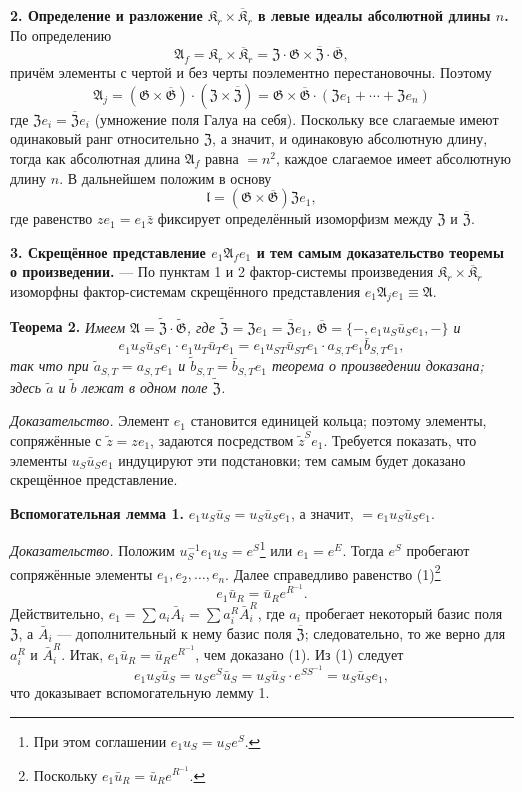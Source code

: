 \documentclass[11pt]{article}
\newcommand{\srcfn}[2]{\footnote{#2}}
\begin{document}
\noindent\textbf{2. Определение и разложение \(\mathfrak K_r\times\overline{\mathfrak K}_r\) в левые идеалы абсолютной длины \(n\).} По определению
\[
\mathfrak A_f=\mathfrak K_r\times\overline{\mathfrak K}_r
=\mathfrak Z\cdot\mathfrak G\times\overline{\mathfrak Z}\cdot\overline{\mathfrak G},
\]
причём элементы с чертой и без черты поэлементно перестановочны. Поэтому
\[
\mathfrak A_j
=(\mathfrak G\times\overline{\mathfrak G})\cdot(\mathfrak Z\times\overline{\mathfrak Z})
=\mathfrak G\times\overline{\mathfrak G}\cdot(\mathfrak Ze_1+\cdots+\mathfrak Ze_n)
\]
где \(\mathfrak Ze_i=\overline{\mathfrak Z}e_i\) (умножение поля Галуа на себя). Поскольку все слагаемые имеют одинаковый ранг относительно \(\mathfrak Z\), а значит, и одинаковую абсолютную длину, тогда как абсолютная длина \(\mathfrak A_f\) равна \(=n^2\), каждое слагаемое имеет абсолютную длину \(n\). В дальнейшем положим в основу
\[
\mathfrak l=(\mathfrak G\times\overline{\mathfrak G})\mathfrak Ze_1,
\]
где равенство \(ze_1=e_1\bar z\) фиксирует определённый изоморфизм между \(\mathfrak Z\) и \(\overline{\mathfrak Z}\).

\noindent\textbf{3. Скрещённое представление \(e_1\mathfrak A_fe_1\) и тем самым доказательство теоремы о произведении.} --- По пунктам 1 и 2 фактор-системы произведения \(\mathfrak K_r\times\overline{\mathfrak K}_r\) изоморфны фактор-системам скрещённого представления \(e_1\mathfrak A_je_1\equiv\mathfrak A\).

\noindent\textbf{Теорема 2.} \emph{Имеем \(\mathfrak A=\widetilde{\mathfrak Z}\cdot\widetilde{\mathfrak G}\), где \(\widetilde{\mathfrak Z}=\mathfrak Ze_1=\overline{\mathfrak Z}e_1\), \(\overline{\mathfrak G}=\{-,e_1u_S\bar u_Se_1,-\}\) и
\[
e_1u_S\bar u_Se_1\cdot e_1u_T\bar u_Te_1
=e_1u_{ST}\bar u_{ST}e_1\cdot a_{S,T}e_1\bar b_{S,T}e_1,
\]
так что при \(\tilde a_{S,T}=a_{S,T}e_1\) и \(\tilde b_{S,T}=\bar b_{S,T}e_1\) теорема о произведении доказана; здесь \(\tilde a\) и \(\tilde b\) лежат в одном поле \(\widetilde{\mathfrak Z}\).}

\noindent\emph{Доказательство.} Элемент \(e_1\) становится единицей кольца; поэтому элементы, сопряжённые с \(\tilde z=ze_1\), задаются посредством \(\tilde z^Se_1\). Требуется показать, что элементы \(u_S\bar u_Se_1\) индуцируют эти подстановки; тем самым будет доказано скрещённое представление.

\noindent\textbf{Вспомогательная лемма 1.} \(e_1u_S\bar u_S=u_S\bar u_Se_1\), а значит, \(=e_1u_S\bar u_Se_1\).

\noindent\emph{Доказательство.} Положим \(u_S^{-1}e_1u_S=e^S\)\srcfn{1}{При этом соглашении \(e_1u_S=u_Se^S\).} или \(e_1=e^E\). Тогда \(e^S\) пробегают сопряжённые элементы \(e_1,e_2,\ldots,e_n\). Далее справедливо равенство (1)\srcfn{2}{Поскольку \(e_1\bar u_R=\bar u_Re^{R^{-1}}\).}
\[
e_1\bar u_R=\bar u_Re^{R^{-1}}.
\]
Действительно, \(e_1=\sum a_i\bar A_i=\sum a_i^R\bar A_i^R\), где \(a_i\) пробегает некоторый базис поля \(\mathfrak Z\), а \(\bar A_i\) --- дополнительный к нему базис поля \(\overline{\mathfrak Z}\); следовательно, то же верно для \(a_i^R\) и \(\bar A_i^R\). Итак, \(e_1\bar u_R=\bar u_Re^{R^{-1}}\), чем доказано (1). Из (1) следует
\[
e_1u_S\bar u_S=u_Se^S\bar u_S=u_S\bar u_S\cdot e^{SS^{-1}}=u_S\bar u_Se_1,
\]
что доказывает вспомогательную лемму 1.
\end{document}
